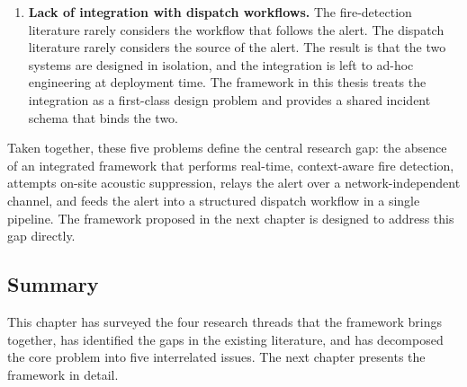 \begin{enumerate}
\item \textbf{Lack of integration with dispatch workflows.} The fire-detection literature rarely considers the workflow that follows the alert. The dispatch literature rarely considers the source of the alert. The result is that the two systems are designed in isolation, and the integration is left to ad-hoc engineering at deployment time. The framework in this thesis treats the integration as a first-class design problem and provides a shared incident schema that binds the two.
\end{enumerate}

Taken together, these five problems define the central research gap: the absence of an integrated framework that performs real-time, context-aware fire detection, attempts on-site acoustic suppression, relays the alert over a network-independent channel, and feeds the alert into a structured dispatch workflow in a single pipeline. The framework proposed in the next chapter is designed to address this gap directly.

\subsection{Summary}

This chapter has surveyed the four research threads that the framework brings together, has identified the gaps in the existing literature, and has decomposed the core problem into five interrelated issues. The next chapter presents the framework in detail.
